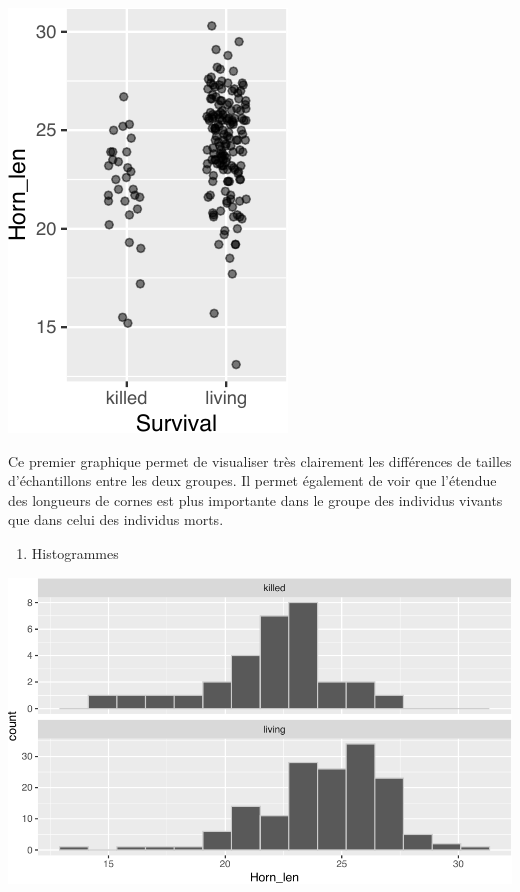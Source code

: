 \documentclass[
  a4paper,
]{article}
\newenvironment{Shaded}{\begin{snugshade}}{\end{snugshade}}
\newcommand{\DataTypeTok}[1]{\textcolor[rgb]{0.00,0.34,0.68}{#1}}
\newcommand{\DecValTok}[1]{\textcolor[rgb]{0.69,0.50,0.00}{#1}}
\newcommand{\FloatTok}[1]{\textcolor[rgb]{0.69,0.50,0.00}{#1}}
\newcommand{\KeywordTok}[1]{\textcolor[rgb]{0.12,0.11,0.11}{\textbf{#1}}}
\newcommand{\NormalTok}[1]{\textcolor[rgb]{0.12,0.11,0.11}{#1}}
\newcommand{\OperatorTok}[1]{\textcolor[rgb]{0.12,0.11,0.11}{#1}}
\newcommand{\StringTok}[1]{\textcolor[rgb]{0.75,0.01,0.01}{#1}}
\providecommand{\tightlist}{%
  \setlength{\itemsep}{0pt}\setlength{\parskip}{0pt}}
\begin{document}
\begin{center}\includegraphics[width=0.25\linewidth]{figure/unnamed-chunk-50-1} \end{center}

Ce premier graphique permet de visualiser très clairement les différences de tailles d'échantillons entre les deux groupes. Il permet également de voir que l'étendue des longueurs de cornes est plus importante dans le groupe des individus vivants que dans celui des individus morts.

\begin{enumerate}
\def\labelenumi{\arabic{enumi}.}
\setcounter{enumi}{1}
\tightlist
\item
  Histogrammes
\end{enumerate}

\begin{Shaded}
\end{Shaded}

\begin{center}\includegraphics[width=0.9\linewidth]{figure/unnamed-chunk-51-1} \end{center}
\end{document}
